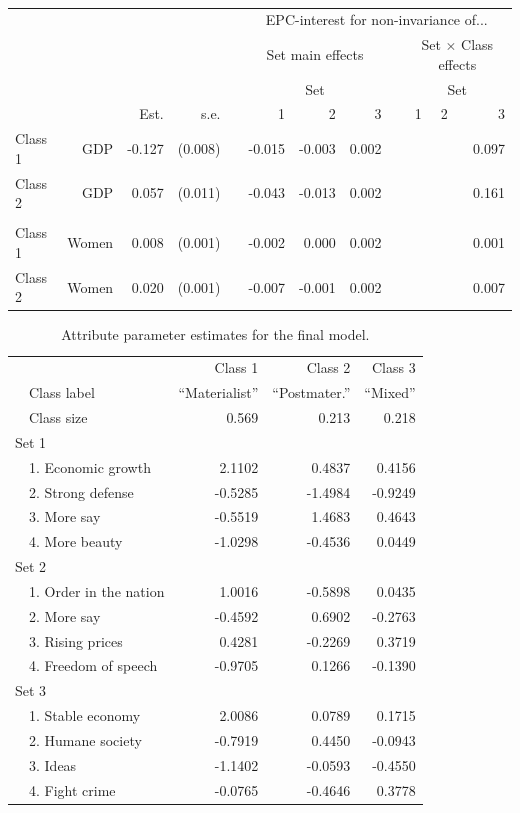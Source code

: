 \documentclass[letterpaper,12pt]{article}
\begin{document}
\begin{table}
	\begin{tabular}{lrrrrrrrrrrr}
	\hline
		&&&&&\multicolumn{7}{c}{EPC-interest for non-invariance of...}\\
	&&&&&\multicolumn{3}{c}{Set main effects} && \multicolumn{3}{c}{Set $\times$ Class effects}\\
			\hline
		&&&&&\multicolumn{3}{c}{Set} && \multicolumn{3}{c}{Set}\\
\cline{6-8}\cline{10-12}
			&	&	Est.&	s.e.&	&	1  &	2  &	3  &&	  1&	2 &	3\\
				\hline
Class 1&	GDP&	-0.127&	(0.008)&	&	-0.015&	-0.003&	0.002&&	&	&	0.097\\
Class 2&	GDP&	0.057&	(0.011)&	&	-0.043&	-0.013&	0.002&&	&	&	0.161\\
\\
Class 	1&	Women&	0.008&	(0.001)&	&	-0.002&	0.000&	0.002&	&&	&	0.001\\
Class 	2&	Women&	0.020&	(0.001)&	&	-0.007&	-0.001&	0.002&	&&	&	0.007\\
\hline
	\end{tabular}
	\caption{\label{tab:epc-interest-model2}}

\end{table}



\begin{table}\centering
	\begin{tabular}{llrrr}
	\hline
			&&	Class 1	&	Class 2	&	Class 3\\
			&Class label& ``Materialist'' & ``Postmater.'' & ``Mixed''\\
& Class size & 0.569 & 0.213 & 0.218\\
				\hline
\multicolumn{3}{l}{Set 1}\\
& 1. Economic growth	&	2.1102	&	0.4837	&	0.4156\\
& 2. Strong defense	&	-0.5285	&	-1.4984	&	-0.9249\\
& 3. More say	&	-0.5519	&	1.4683	&	0.4643\\
& 4. More beauty	&	-1.0298	&	-0.4536	&	0.0449\\
\multicolumn{3}{l}{Set 2}\\
& 1. Order in the nation	&	1.0016	&	-0.5898	&	0.0435\\
& 2. More say	&	-0.4592	&	0.6902	&	-0.2763\\
& 3. Rising prices	&	0.4281	&	-0.2269	&	0.3719\\
& 4. Freedom of speech	&	-0.9705	&	0.1266	&	-0.1390\\
\multicolumn{3}{l}{Set 3}\\
& 1. Stable economy	&	2.0086	&	0.0789	&	0.1715\\
& 2. Humane society	&	-0.7919	&	0.4450	&	-0.0943\\
& 3. Ideas	&	-1.1402	&	-0.0593	&	-0.4550\\
& 4. Fight crime	&	-0.0765	&	-0.4646	&	0.3778\\
	\hline
	\end{tabular}
	\caption{\label{tab:attribute-parameters}Attribute parameter estimates for the 
		final model.}

\end{table}
\end{document}
